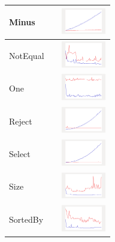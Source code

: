 \begin{longtable}{ m{2.5cm} m{8cm} m{2cm} }
Minus &

&
\includegraphics[width=2cm]{../graphs/set/small/Minus}
\\\hline

NotEqual &

&
\includegraphics[width=2cm]{../graphs/set/small/NEQ}
\\\hline

One &

&
\includegraphics[width=2cm]{../graphs/set/small/One}
\\\hline

Reject &

&
\includegraphics[width=2cm]{../graphs/set/small/Reject}
\\\hline

Select &

&
\includegraphics[width=2cm]{../graphs/set/small/Select}
\\\hline

Size &

&
\includegraphics[width=2cm]{../graphs/set/small/Size}
\\\hline

SortedBy &

&
\includegraphics[width=2cm]{../graphs/set/small/sortedBy}
\\\hline


\end{longtable}
